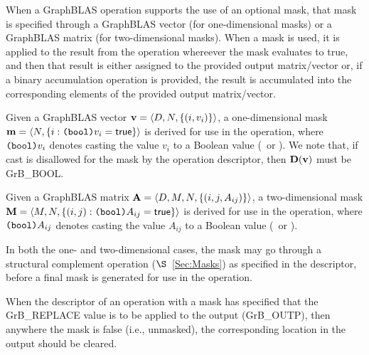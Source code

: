 %
%

When a GraphBLAS operation supports the use of an optional mask, that mask is
specified through a GraphBLAS vector (for one-dimensional masks) or
a GraphBLAS matrix (for two-dimensional masks).  When a mask is used, it is 
applied to the result from the operation whereever the mask evaluates to true, 
and then that result is either assigned 
to the provided output matrix/vector or, if a binary accumulation operation is 
provided, the result is accumulated into the corresponding elements of the provided 
output matrix/vector.

Given a GraphBLAS vector ${\bf v} = \langle D,N, \{ (i,v_i) \} \rangle$, a
one-dimensional mask ${\bf m} = \langle N, \{ i : \mbox{\tt (bool)}v_i = {\sf true} \} \rangle$
is derived for use in the operation, where $\mbox{\tt (bool)}v_i$ denotes
casting the value $v_i$ to a Boolean value (\true\ or \false).
We note that, if cast is disallowed for the mask by the operation descriptor, then
$\bold{D}({\bf v})$ must be {\sf GrB\_BOOL}.

Given a GraphBLAS matrix ${\bf A} = \langle D, M, N, \{ (i,j,A_{ij}) \} \rangle$,
a two-dimensional mask ${\bf M} = \langle M,N, \{ (i,j) : \mbox{\tt (bool)}A_{ij} = {\sf true} \} \rangle$
is derived for use in the operation, where $\mbox{\tt (bool)}A_{ij}$ denotes
casting the value $A_{ij}$ to a Boolean value (\true\ or \false).

In both the one- and two-dimensional cases, the mask may go through a structural
complement operation ($\S$~\ref{Sec:Masks}) as specified in the descriptor, before 
a final mask is generated for use in the operation.

When the descriptor of an operation with a mask has specified that 
the {\sf GrB\_REPLACE} value is to be applied to the output ({\sf GrB\_OUTP}),
then anywhere the mask is false (i.e., unmasked), the corresponding location in
the output should be cleared.

 
